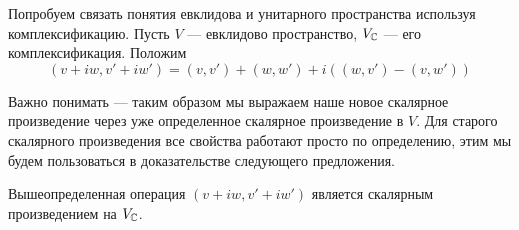 \documentclass[../main.tex]{subfiles}
\begin{document}
Попробуем связать понятия евклидова и унитарного пространства используя комплексификацию. Пусть $V$ --- евклидово пространство, $V_{\mathbb{C}}$ --- его комплексификация. Положим
\begin{equation*}
  (v + iw, v' + iw') = (v, v') + (w, w') + i((w, v') - (v, w'))
\end{equation*}

\begin{editremark}
  Важно понимать --- таким образом мы выражаем наше новое скалярное произведение через уже определенное скалярное произведение в $V$. Для старого скалярного произведения все свойства работают просто по определению, этим мы будем пользоваться в доказательстве следующего предложения.
\end{editremark}

\begin{theorem-non}
  Вышеопределенная операция $(v + iw, v' + iw')$ является скалярным произведением на $V_{\mathbb{C}}$.
\end{theorem-non}
\end{document}
